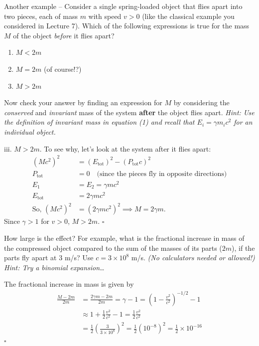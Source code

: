 \documentclass[11pt, letterpaper, openany]{book}
\newenvironment{exercise}[1][Exercise]{%
  \tcolorbox[blanker, breakable, left=1em,
    before skip=1em, after skip=1em,
    borderline west={3pt}{0pt}{PhysNavy},
    colback=PhysCream,
    before upper={\textcolor{PhysNavy}{\sffamily\bfseries #1:}\space}
  ]%
}{%
  \endtcolorbox%
}
\newenvironment{solution}[1][Solution]{%
  \tcolorbox[blanker, breakable, left=1em,
    before skip=1em, after skip=1em,
    borderline west={2pt}{0pt}{PhysTeal},
    colback=PhysCream,
    before upper={\textcolor{PhysTeal}{\sffamily\bfseries #1.}\space}
  ]%
}{%
  \hfill\textcolor{PhysTeal}{\ensuremath{\square}}\endtcolorbox%
}
\begin{document}
\begin{exercise}[Exercise 3]
Another example -- Consider a single spring-loaded object that flies apart into two pieces, each of mass $m$ with speed $v > 0$ (like the classical example you considered in Lecture 7). Which of the following expressions is true for the mass $M$ of the object \textit{before} it flies apart?
\begin{enumerate}[label=\roman*.]
    \item $M < 2m$
    \item $M = 2m$ (of course!?)
    \item $M > 2m$
\end{enumerate}
Now check your answer by finding an expression for $M$ by considering the \textit{conserved} and \textit{invariant} mass of the system \textbf{after} the object flies apart.
\textit{Hint: Use the definition of invariant mass in equation (1) and recall that $E_i = \gamma m_i c^2$ for an individual object.}
\end{exercise}
\begin{solution}
iii. $M > 2m$.
To see why, let's look at the system after it flies apart:
\begin{align*}
    (Mc^2)^2 &= (E_{\text{tot}})^2 - (P_{\text{tot}}c)^2 \\
    P_{\text{tot}} &= 0 \quad \text{(since the pieces fly in opposite directions)} \\
    E_1 &= E_2 = \gamma mc^2 \\
    E_{\text{tot}} &= 2\gamma mc^2 \\
    \text{So, } (Mc^2)^2 &= (2\gamma mc^2)^2 \implies M = 2\gamma m.
\end{align*}
Since $\gamma > 1$ for $v > 0$, $M > 2m$.
\end{solution}

\begin{exercise}[Exercise 4]
How large is the effect? For example, what is the fractional increase in mass of the compressed object compared to the sum of the masses of its parts ($2m$), if the parts fly apart at 3 m/s?
Use $c = 3 \times 10^8$ m/s. \textit{(No calculators needed or allowed!)} \\
\textit{Hint: Try a binomial expansion\dots}
\end{exercise}
\begin{solution}
The fractional increase in mass is given by
\begin{align*}
    \frac{M - 2m}{2m} &= \frac{2\gamma m - 2m}{2m} = \gamma - 1 = \left(1 - \frac{v^2}{c^2}\right)^{-1/2} - 1 \\
    &\approx 1 + \frac{1}{2}\frac{v^2}{c^2} - 1 = \frac{1}{2}\frac{v^2}{c^2} \\
    &= \frac{1}{2} \left(\frac{3}{3 \times 10^8}\right)^2 = \frac{1}{2} (10^{-8})^2 = \frac{1}{2} \times 10^{-16}
\end{align*}
\end{solution}
\end{document}
